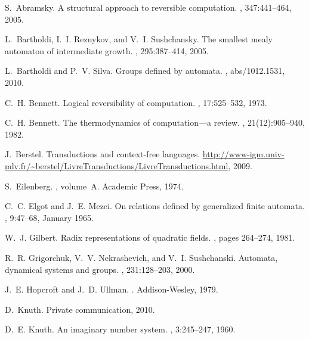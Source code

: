 \documentclass[12pt]{svmult}
\begin{document}
\begin{thebibliography}{10}

S.~Abramsky.
\newblock A structural approach to reversible computation.
, 347:441--464, 2005.

L.~Bartholdi, I.~I. Reznykov, and V.~I. Sushchansky.
\newblock The smallest mealy automaton of intermediate growth.
, 295:387--414, 2005.

L.~Bartholdi and P.~V. Silva.
\newblock Groups defined by automata.
, abs/1012.1531, 2010.

C.~H. Bennett.
\newblock Logical reversibility of computation.
, 17:525--532, 1973.

C.~H. Bennett.
\newblock The thermodynamics of computation---a review.
, 21(12):905--940, 1982.

J.~Berstel.
\newblock Transductions and context-free languages.
\newblock
  \url{http://www-igm.univ-mlv.fr/~berstel/LivreTransductions/LivreTransductions.html},
  2009.

S.~Eilenberg.
, volume~A.
\newblock Academic Press, 1974.

C.~C. Elgot and J.~E. Mezei.
\newblock On relations defined by generalized finite automata.
, 9:47--68, January 1965.

W.~J. Gilbert.
\newblock Radix representations of quadratic fields.
, pages 264--274, 1981.

R.~R. Grigorchuk, V.~V. Nekrashevich, and V.~I. Sushchanski.
\newblock Automata, dynamical systems and groups.
, 231:128--203, 2000.

J.~E. Hopcroft and J.~D. Ullman.
.
\newblock Addison-Wesley, 1979.

D.~Knuth.
\newblock Private communication, 2010.

D.~E. Knuth.
\newblock An imaginary number system.
, 3:245--247, 1960.


\end{thebibliography}
\end{document}
